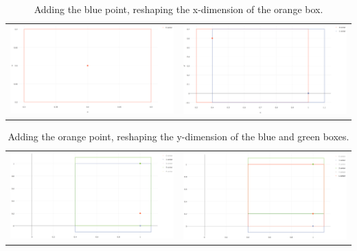\documentclass[11pt,margin=1in]{article}
\begin{document}
\begin{table}[!htbp]
  \centering
  \begin{tabular}{cc}
    \includegraphics[width=7.5cm]{1-Before} & \includegraphics[width=7.5cm]{1-After} \\
  \end{tabular}
  \caption{Adding the blue point, reshaping the x-dimension of the orange box.}
\end{table}

\begin{table}[!htbp]
  \centering
  \begin{tabular}{cc}
    \includegraphics[width=7.5cm]{2-Before} & \includegraphics[width=7.5cm]{2-After} \\
  \end{tabular}
  \caption{Adding the orange point, reshaping the y-dimension of the
    blue and green boxes.}
\end{table}
\end{document}
